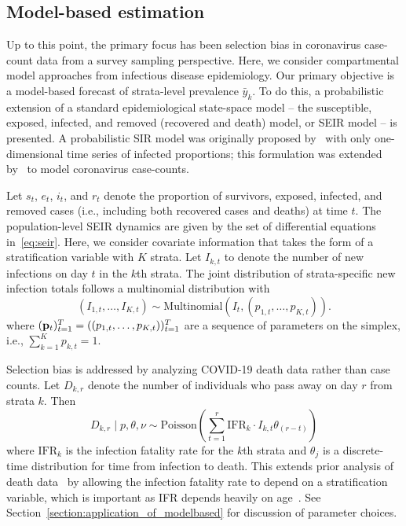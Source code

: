 \documentclass[11pt]{amsart}
\numberwithin{equation}{section}
\theoremstyle{plain}
\begin{document}
 \subsection{Model-based estimation}
 \label{section:modelbased}

 Up to this point, the primary focus has been selection bias in coronavirus case-count data from a survey sampling perspective.  Here, we consider compartmental model approaches from infectious disease epidemiology.  Our primary objective is a model-based forecast of strata-level prevalence $\bar y_k$. To do this, a probabilistic extension of a standard epidemiological state-space model -- the susceptible, exposed, infected, and removed (recovered and death) model, or SEIR model -- is presented. A probabilistic SIR model was originally proposed by~\cite{Osthus2017} with only one-dimensional time series of infected proportions; this formulation was extended by~\cite{Song2020} to model coronavirus case-counts.

 Let $s_t$, $e_t$, $i_t$, and $r_t$ denote the proportion of survivors, exposed, infected, and removed cases (i.e., including both recovered cases and deaths) at time $t$.  The population-level SEIR dynamics are given by the set of differential equations in~\eqref{eq:seir}.
Here, we consider covariate information that takes the form of a stratification variable with $K$ strata.  Let $I_{k,t}$ to denote the number of new infections on day $t$ in the $k$th strata.  The joint distribution of strata-specific new infection totals follows a multinomial distribution with
 $$
 ( I_{1,t}, \ldots, I_{K,t} ) \sim \text{Multinomial} \left( I_t, (p_{1,t}, \ldots, p_{K, t}) \right).
 $$
 where $( {\bf p}_t )_{t=1}^T = ( (p_{1,t}, \ldots, p_{K, t}) )_{t=1}^T$ are a sequence of parameters on the simplex, i.e., $\sum_{k=1}^K p_{k,t} = 1$.

 Selection bias is addressed by analyzing COVID-19 death data rather than case counts.  Let $D_{k,r}$ denote the number of individuals who pass away on day $r$ from strata $k$.  Then
 $$
 D_{k,r} \mid p, \theta, \nu \sim \text{Poisson} \left( \sum_{t=1}^r \text{IFR}_{k} \cdot I_{k,t} \theta_{(r-t)} \right)
 $$
 where $\text{IFR}_{k}$ is the infection fatality rate for the $k$th strata and $\theta_{j}$ is a discrete-time distribution for time from infection to death.  This extends prior analysis of death data~\cite{Johndrow2020} by allowing the infection fatality rate to depend on a stratification variable, which is important as IFR depends heavily on age~\citep{Levin2020}. See Section~\ref{section:application_of_modelbased} for discussion of parameter choices.  %
\end{document}
